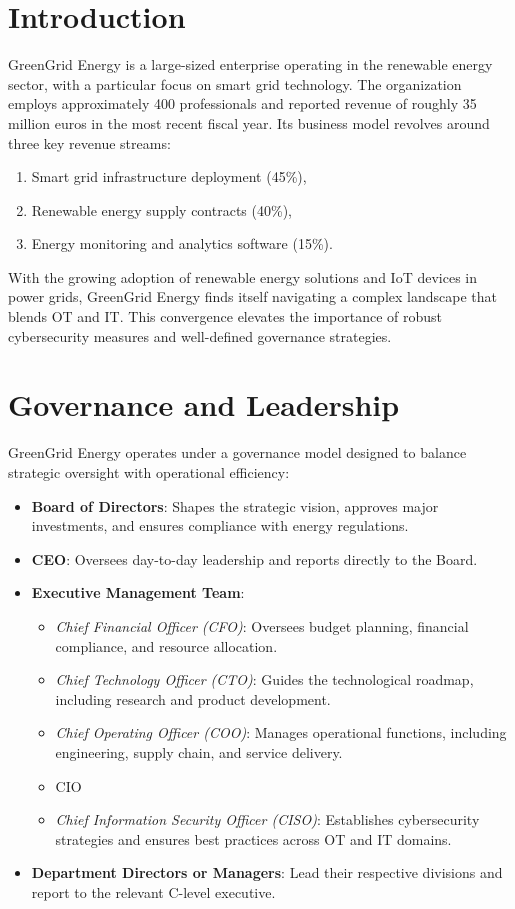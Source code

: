 \section{Introduction}
GreenGrid Energy is a large-sized enterprise \cite{Portugal2020} operating in the renewable energy sector, with a particular focus on smart grid technology. The organization employs approximately 400 professionals and reported revenue of roughly 35 million euros in the most recent fiscal year. Its business model revolves around three key revenue streams:
\begin{enumerate}
    \item Smart grid infrastructure deployment (45\%),
    \item Renewable energy supply contracts (40\%),
    \item Energy monitoring and analytics software (15\%).
\end{enumerate}

With the growing adoption of renewable energy solutions and \ac{IoT} devices in power grids, GreenGrid Energy finds itself navigating a complex landscape that blends \ac{OT} and \ac{IT}. This convergence elevates the importance of robust cybersecurity measures and well-defined governance strategies.

\section{Governance and Leadership}
GreenGrid Energy operates under a governance model designed to balance strategic oversight with operational efficiency:
\begin{itemize}
    \item \textbf{Board of Directors}: Shapes the strategic vision, approves major investments, and ensures compliance with energy regulations.
    \item \textbf{\ac{CEO}}: Oversees day-to-day leadership and reports directly to the Board.
    \item \textbf{Executive Management Team}:
        \begin{itemize}
            \item \emph{Chief Financial Officer (CFO)}: Oversees budget planning, financial compliance, and resource allocation.
            \item \emph{Chief Technology Officer (CTO)}: Guides the technological roadmap, including research and product development.
            \item \emph{Chief Operating Officer (COO)}: Manages operational functions, including engineering, supply chain, and service delivery.
            \item CIO
            \item \emph{Chief Information Security Officer (CISO)}: Establishes cybersecurity strategies and ensures best practices across OT and IT domains.
        \end{itemize}
    \item \textbf{Department Directors or Managers}: Lead their respective divisions and report to the relevant C-level executive.
\end{itemize}



